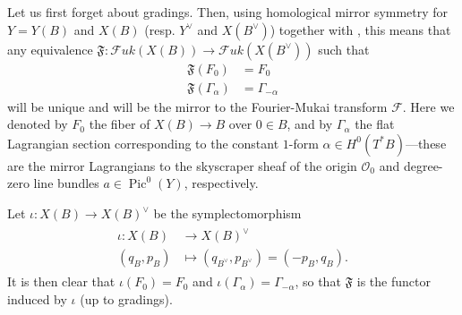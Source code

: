 \documentclass[10pt]{amsart}
\theoremstyle{definition}
\theoremstyle{remark}
\DeclareMathOperator{\Pic}{Pic}
\newcommand{\mcal}{\mathcal}
\begin{document}
Let us first forget about gradings.
Then, using homological mirror symmetry \cite{abouzaid2021homological} for $Y=Y(B)$ and $X(B)$ (resp. $Y^\vee$ and $X(B^\vee)$)  together with , this means that any equivalence $\mathfrak F:\mcal Fuk(X(B)) \to \mcal Fuk(X(B^\vee))$ such that
\begin{align}
    \mathfrak F(F_0) &= F_0\\
    \mathfrak F(\Gamma_\alpha) &= \Gamma_{-\alpha} \label{eq:sections_shift}
\end{align}
will be unique and will be the mirror to the Fourier-Mukai transform $\mcal F$.
Here we denoted by $F_0$ the fiber of $X(B) \to B$ over $0 \in B$, and by $\Gamma_\alpha$ the flat Lagrangian section corresponding to the constant $1$-form $\alpha\in H^0(T^*B)$---these are the mirror Lagrangians to the skyscraper sheaf of the origin $\mcal O_0$ and degree-zero line bundles $a \in \Pic^0(Y)$, respectively.

Let $\iota: X(B) \to X(B)^\vee$ be the symplectomorphism 
\begin{align}\label{eq:iota}
    \begin{split}
        \iota:X(B) &\to X(B)^\vee\\
        (q_B,p_B) &\mapsto (q_{B^\vee}, p_{B^\vee}) =  (-p_B,q_B).
    \end{split}
\end{align}
It is then clear that $\iota(F_0) = F_0$ and $\iota(\Gamma_\alpha) = \Gamma_{-\alpha}$, so that $\mathfrak F$ is the functor induced by $\iota$ (up to gradings).
\end{document}
